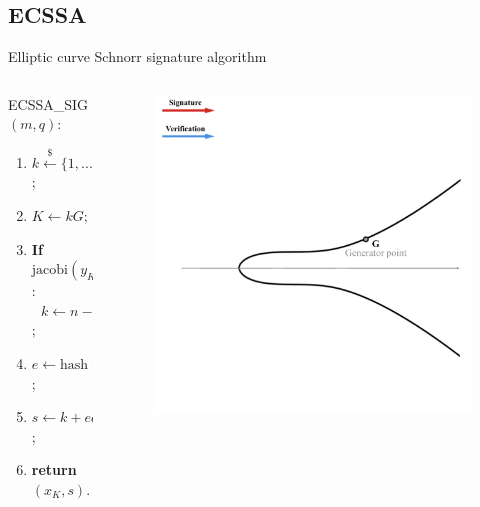 \documentclass[slidescentered]{beamer}
\begin{document}
	\subsection{ECSSA}
	\begin{frame}{Elliptic curve Schnorr signature algorithm}
		\begin{columns}
			\begin{column}{0.6\linewidth}
				ECSSA\_SIG$(m, q)$:
				\begin{enumerate}
					\item<3 -> $k \xleftarrow{\text{\$}} \{1, ..., n - 1\}$;
					\item<4 -> $K \gets kG$;
					\item<5 -> \textbf{If} $\text{jacobi}(y_K) \neq 1$: \\$\ \ \ k \gets n - k$;
					\item<6 -> $e \gets \text{hash}(x_K || qG || m) \ (\text{mod} \ n)$;
					\item<7 -> $s \gets k + eq \ (\text{mod} \ n)$;
					\item<8 -> \textbf{return} $(x_K, s)$.
				\end{enumerate}
			\end{column}
			\begin{column}{0.5\linewidth}
				\begin{figure}
					 {\vspace*{-0.7cm}
						\hspace*{-0.9cm}
						\includegraphics[scale=0.28]{images/Schnorr1}
}
\end{figure}
\end{column}
\end{columns}
\end{frame}
\end{document}
